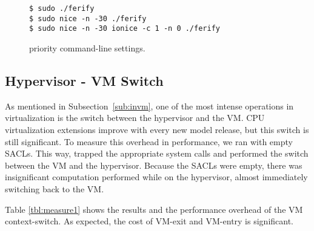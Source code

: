 \begin{figure}[ht]
	\centering
	\footnotesize{\selectfont 
		\begin{lstlisting}
$ sudo ./ferify
$ sudo nice -n -30 ./ferify
$ sudo nice -n -30 ionice -c 1 -n 0 ./ferify
	\end{lstlisting}}
	\caption{ priority command-line settings.}
	\label{fig:script}
\end{figure}


\subsection{Hypervisor - \ac{VM} Switch}

\par As mentioned in Subsection~\ref{sub:invm}, one of the most intense operations in virtualization is the switch between the hypervisor and the \ac{VM}. \ac{CPU} virtualization extensions improve with every new model release, but this switch is still significant. To measure this overhead in performance, we ran  with empty \acp{SACL}. This way,  trapped the appropriate system calls and performed the switch between the \ac{VM} and the hypervisor. Because the \acp{SACL} were empty, there was insignificant computation performed while on the hypervisor, almost immediately switching back to the \ac{VM}. 

\par Table \ref{tbl:measure1} shows the results and the performance overhead of the \ac{VM} context-switch. As expected, the cost of VM-exit and VM-entry is significant. 

